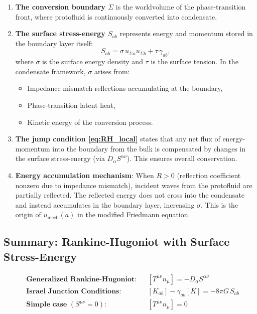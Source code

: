 \begin{enumerate}
    \item \textbf{The conversion boundary $\Sigma$} is the worldvolume of the phase-transition front, where protofluid is continuously converted into condensate.

    \item \textbf{The surface stress-energy $S_{ab}$} represents energy and momentum stored in the boundary layer itself:
    \begin{equation}
    S_{ab} = \sigma \, u_{\Sigma a} u_{\Sigma b} + \tau \, \gamma_{ab},
    \end{equation}
    where $\sigma$ is the surface energy density and $\tau$ is the surface tension. In the condensate framework, $\sigma$ arises from:
    \begin{itemize}
        \item Impedance mismatch reflections accumulating at the boundary,
        \item Phase-transition latent heat,
        \item Kinetic energy of the conversion process.
    \end{itemize}

    \item \textbf{The jump condition \eqref{eq:RH_local}} states that any net flux of energy-momentum into the boundary from the bulk is compensated by changes in the surface stress-energy (via $D_\alpha S^{\alpha\nu}$). This ensures overall conservation.

    \item \textbf{Energy accumulation mechanism}: When $R > 0$ (reflection coefficient nonzero due to impedance mismatch), incident waves from the protofluid are partially reflected. The reflected energy does not cross into the condensate and instead accumulates in the boundary layer, increasing $\sigma$. This is the origin of $u_{\text{mech}}(a)$ in the modified Friedmann equation.
\end{enumerate}

\subsection{Summary: Rankine-Hugoniot with Surface Stress-Energy}
\label{app:RH_summary}

\begin{equation}
\boxed{
\begin{aligned}
&\textbf{Generalized Rankine-Hugoniot:} && [T^{\mu\nu} n_\mu] = -D_\alpha S^{\alpha\nu} \\[6pt]
&\textbf{Israel Junction Conditions:} && [K_{ab}] - \gamma_{ab}[K] = -8\pi G \, S_{ab} \\[6pt]
&\textbf{Simple case } (S^{\mu\nu} = 0): && [T^{\mu\nu} n_\mu] = 0
\end{aligned}
}
\end{equation}

